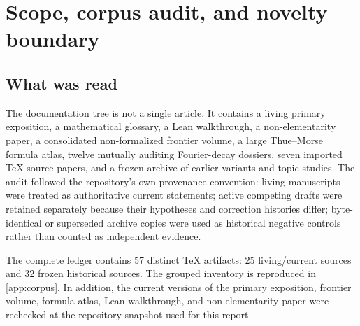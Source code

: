\documentclass[11pt]{article}
\numberwithin{equation}{section}
\theoremstyle{definition}
\theoremstyle{remark}
\begin{document}
\tableofcontents
\clearpage
{}

\section{Scope, corpus audit, and novelty boundary}
\label{sec:scope}

\subsection{What was read}

The documentation tree is not a single article.  It contains a living primary exposition, a mathematical glossary, a Lean walkthrough, a non-elementarity paper, a consolidated non-formalized frontier volume, a large Thue--Morse formula atlas, twelve mutually auditing Fourier-decay dossiers, seven imported TeX source papers, and a frozen archive of earlier variants and topic studies.  The audit followed the repository's own provenance convention: living manuscripts were treated as authoritative current statements; active competing drafts were retained separately because their hypotheses and correction histories differ; byte-identical or superseded archive copies were used as historical negative controls rather than counted as independent evidence.

The complete ledger contains 57 distinct TeX artifacts: 25 living/current sources and 32 frozen historical sources.  The grouped inventory is reproduced in \cref{app:corpus}.  In addition, the current versions of the primary exposition, frontier volume, formula atlas, Lean walkthrough, and non-elementarity paper were rechecked at the repository snapshot used for this report.
\end{document}
